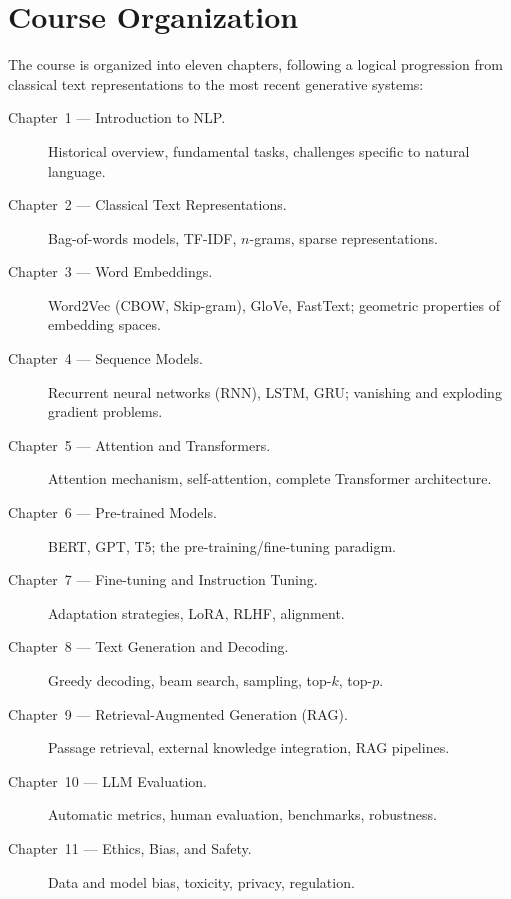 \section*{Course Organization}

The course is organized into eleven chapters, following a logical progression
from classical text representations to the most recent generative systems:

\begin{description}
    \item[Chapter~1 --- Introduction to NLP.]
        Historical overview, fundamental tasks, challenges specific to natural
        language.
    \item[Chapter~2 --- Classical Text Representations.]
        Bag-of-words models, TF-IDF, $n$-grams, sparse representations.
    \item[Chapter~3 --- Word Embeddings.]
        Word2Vec (CBOW, Skip-gram), GloVe, FastText; geometric properties of
        embedding spaces.
    \item[Chapter~4 --- Sequence Models.]
        Recurrent neural networks (RNN), LSTM, GRU; vanishing and exploding
        gradient problems.
    \item[Chapter~5 --- Attention and Transformers.]
        Attention mechanism, self-attention, complete Transformer architecture.
    \item[Chapter~6 --- Pre-trained Models.]
        BERT, GPT, T5; the pre-training/fine-tuning paradigm.
    \item[Chapter~7 --- Fine-tuning and Instruction Tuning.]
        Adaptation strategies, LoRA, RLHF, alignment.
    \item[Chapter~8 --- Text Generation and Decoding.]
        Greedy decoding, beam search, sampling, top-$k$, top-$p$.
    \item[Chapter~9 --- Retrieval-Augmented Generation (RAG).]
        Passage retrieval, external knowledge integration, RAG pipelines.
    \item[Chapter~10 --- LLM Evaluation.]
        Automatic metrics, human evaluation, benchmarks, robustness.
    \item[Chapter~11 --- Ethics, Bias, and Safety.]
        Data and model bias, toxicity, privacy, regulation.
\end{description}

